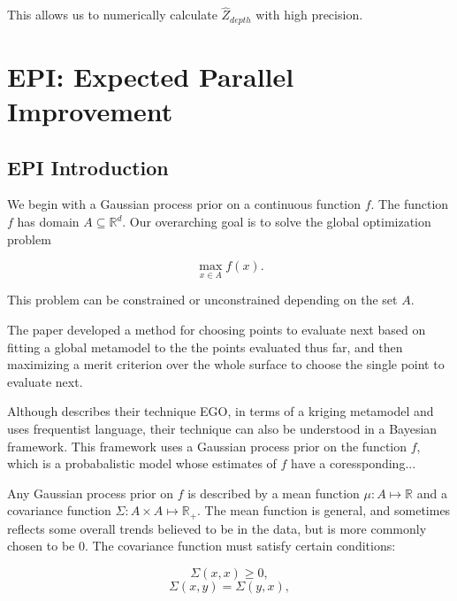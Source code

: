 \documentclass[phd,tocprelim]{cornell}
\begin{document}
This allows us to numerically calculate $\hat{Z}_{depth}$ with high precision.




\part{EPI: Expected Parallel Improvement} %
\label{prt:EPI: Expected Parallel Improvement}

\chapter{EPI Introduction} %
\label{cha:EPI Introduction}

We begin with a Gaussian process prior on a continuous function $f$. The function $f$ has domain $A \subseteq \mathbb{R}^{d}$. Our overarching goal is to solve the global optimization problem

\begin{equation}
\max_{x \in A} f(x).
\end{equation}

This problem can be constrained or unconstrained depending on the set $A$.

The paper \cite{JoScWe98} developed a method for choosing points to evaluate next based on fitting a global metamodel to the the points evaluated thus far, and then maximizing a merit criterion over the whole surface to choose the single point to evaluate next.

Although \cite{JoScWe98} describes their technique EGO, in terms of a kriging metamodel and uses frequentist language, their technique can also be understood in a Bayesian framework. This framework uses a Gaussian process prior on the function $f$, which is a probabalistic model whose estimates of $f$ have a coressponding...

Any Gaussian process prior on $f$ is described by a mean function $\mu : A \mapsto \mathbb{R}$ and a covariance function $\Sigma : A \times A \mapsto \mathbb{R}_{+}$. The mean function is general, and sometimes reflects some overall trends believed to be in the data, but is more commonly chosen to be 0. The covariance function must satisfy certain conditions: 

\begin{equation}\Sigma(x,x) \geq 0,\end{equation}
\begin{equation}\Sigma(x,y) = \Sigma(y,x),\end{equation}
\end{document}
